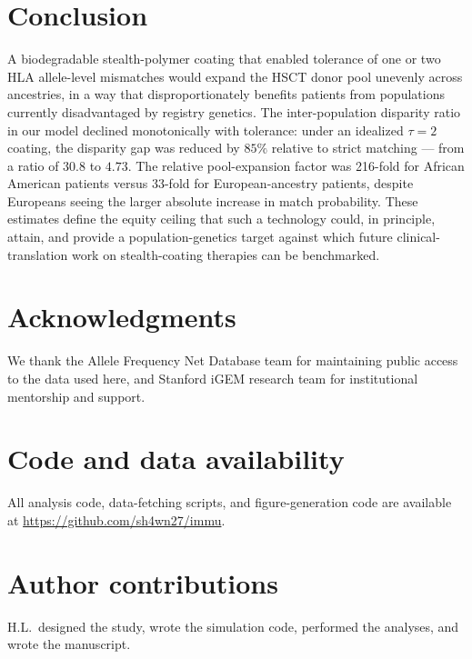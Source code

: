 \documentclass[11pt]{article}
\begin{document}
\section{Conclusion}
\label{sec:conclusion}
A biodegradable stealth-polymer coating that enabled tolerance of one or two HLA allele-level mismatches would expand the HSCT donor pool unevenly across ancestries, in a way that disproportionately benefits patients from populations currently disadvantaged by registry genetics. The inter-population disparity ratio in our model declined monotonically with tolerance: under an idealized $\tau = 2$ coating, the disparity gap was reduced by $85\%$ relative to strict matching --- from a ratio of $30.8$ to $4.73$. The relative pool-expansion factor was 216-fold for African American patients versus 33-fold for European-ancestry patients, despite Europeans seeing the larger absolute increase in match probability. These estimates define the equity ceiling that such a technology could, in principle, attain, and provide a population-genetics target against which future clinical-translation work on stealth-coating therapies can be benchmarked.

\section*{Acknowledgments}
We thank the Allele Frequency Net Database team for maintaining public access to the data used here, and Stanford iGEM research team for institutional mentorship and support.


\section*{Code and data availability}
All analysis code, data-fetching scripts, and figure-generation code are available at \url{https://github.com/sh4wn27/immu}.

\section*{Author contributions}
H.L.\ designed the study, wrote the simulation code, performed the analyses, and wrote the manuscript.



\end{document}
